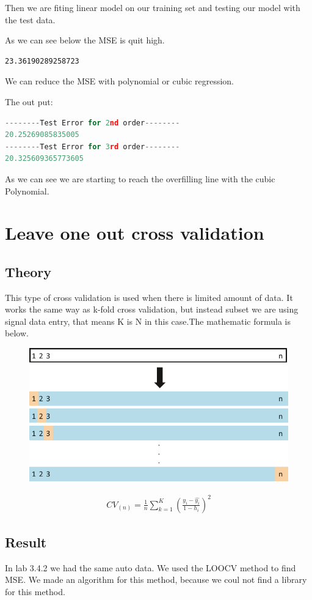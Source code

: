 Then we are fiting linear model on our training set and testing our model with the test data.


As we can see below the MSE is quit high.
\begin{lstlisting}
23.36190289258723
\end{lstlisting}
We can reduce the MSE with polynomial or cubic regression.

The out put:
\begin{lstlisting}[language=Python]
--------Test Error for 2nd order--------
20.25269085835005
--------Test Error for 3rd order--------
20.325609365773605
\end{lstlisting}
As we can see we are starting to reach the overfilling line with the cubic Polynomial. 

\section {Leave one out cross validation}

\subsection{Theory}
This type of cross validation is used when there is limited amount of data. It works the same way as k-fold cross validation, but instead subset we are using signal data entry, that means K is N in this case.The mathematic formula is below. 

\begin{figure}[H]
	\centering
	\includegraphics[width=0.5\linewidth]{crossValidation/LOOCV}
	\caption{}
	\label{fig:loocv}
\end{figure}


\begin{align}\label{fo:LOOCV}
CV_{(n)} = \frac {1}{n} \sum_{k=1}^{K}  (\frac {y_i-\hat{y_i}}{1- h_i})^2
\end{align}



\subsection{Result}
In lab 3.4.2 we had the same auto data. We used the LOOCV method to find MSE. We made an algorithm for this method, because we coul not find a library for this method.

